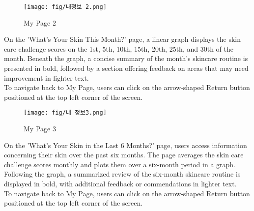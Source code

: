 \documentclass[conference]{IEEEtran}
\begin{document}
\begin{figure}[h]
    \centering
    \texttt{[image: fig/내정보 2.png]}
    \label{fig:My Page 2}
    \caption{My Page 2} 
    \end{figure}
On the 'What's Your Skin This Month?' page, a linear graph displays the skin care challenge scores on the 1st, 5th, 10th, 15th, 20th, 25th, and 30th of the month. Beneath the graph, a concise summary of the month's skincare routine is presented in bold, followed by a section offering feedback on areas that may need improvement in lighter text.\\
To navigate back to My Page, users can click on the arrow-shaped Return button positioned at the top left corner of the screen.\\

\begin{figure}[h]
    \centering
    \texttt{[image: fig/내 정보3.png]}
    \label{fig:My Page 3}
    \caption{My Page 3} 
    \end{figure}
On the 'What's Your Skin in the Last 6 Months?' page, users access information concerning their skin over the past six months. The page averages the skin care challenge scores monthly and plots them over a six-month period in a graph. Following the graph, a summarized review of the six-month skincare routine is displayed in bold, with additional feedback or commendations in lighter text.\\
To navigate back to My Page, users can click on the arrow-shaped Return button positioned at the top left corner of the screen.\\
 

\end{document}

